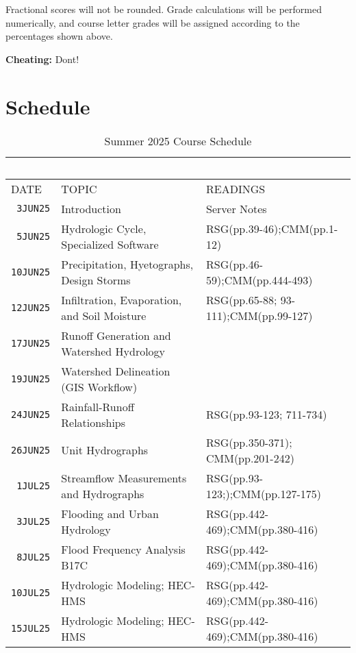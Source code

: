 \documentclass[12pt]{article}
\begin{document}
Fractional scores will not be rounded. Grade calculations will be performed numerically, and course letter grades will be assigned according to the percentages shown above.

\textbf{Cheating:} Dont!

\clearpage
\section*{Schedule}
\begin{table}[ht!]
   \centering
   \caption{Summer 2025 Course Schedule}
   \begin{tabular}{p{0.5in}p{3.0in}p{3.0in}} 
   ~ & ~ & ~  \\
\hline
DATE & TOPIC & READINGS  \\
\hline
\texttt{~3JUN25} & Introduction & Server Notes  \\ %
\texttt{~5JUN25} & Hydrologic Cycle, Specialized Software & RSG(pp.39-46);CMM(pp.1-12) \\ %
\texttt{10JUN25} & Precipitation, Hyetographs, Design Storms & RSG(pp.46-59);CMM(pp.444-493)\\ %
\texttt{12JUN25} & Infiltration, Evaporation, and Soil Moisture &  RSG(pp.65-88; 93-111);CMM(pp.99-127)\\ %
\texttt{17JUN25} & Runoff Generation and Watershed Hydrology \\ %
\texttt{19JUN25} & Watershed Delineation (GIS Workflow) & \\ %
\texttt{24JUN25} & Rainfall-Runoff Relationships & RSG(pp.93-123; 711-734)\\
\texttt{26JUN25} & Unit Hydrographs & RSG(pp.350-371); CMM(pp.201-242)\\
\texttt{~1JUL25} & Streamflow Measurements and Hydrographs & RSG(pp.93-123;);CMM(pp.127-175)\\
\texttt{~3JUL25} & Flooding and Urban Hydrology & RSG(pp.442-469);CMM(pp.380-416) \\ 
\texttt{~8JUL25} & Flood Frequency Analysis B17C & RSG(pp.442-469);CMM(pp.380-416)\\ %
\texttt{10JUL25} & Hydrologic Modeling; HEC-HMS & RSG(pp.442-469);CMM(pp.380-416) \\  %
\texttt{15JUL25} & Hydrologic Modeling; HEC-HMS & RSG(pp.442-469);CMM(pp.380-416)\\ %

\end{tabular}
\end{table}
\end{document}
